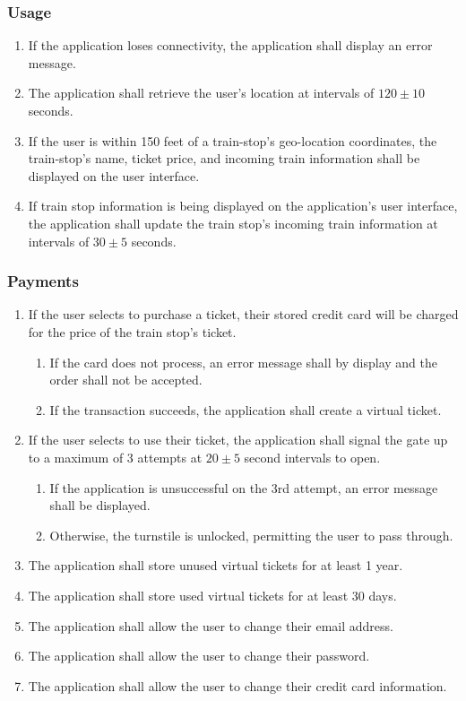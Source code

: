 	\subsubsection{Usage}\begin{enumerate}
		\item If the application loses connectivity, the application shall display an error message. 
		\item The application shall retrieve the user’s location at intervals of $120\pm10$ seconds.
		\item If the user is within 150 feet of a train-stop’s geo-location coordinates, the train-stop’s name, ticket price, and incoming train information shall be displayed on the user interface.
		\item If train stop information is being displayed on the application’s user interface, the application shall update the train stop’s incoming train information at intervals of $30\pm 5$ seconds.
	\end{enumerate}
	
	\subsubsection{Payments}\begin{enumerate}
		\item If the user selects to purchase a ticket, their stored credit card will be charged for the price of the train stop’s ticket.
		\begin{enumerate}
			\item If the card does not process, an error message shall by display and the order shall not be accepted.
			\item If the transaction succeeds, the application shall create a virtual ticket.
		\end{enumerate}
		\item If the user selects to use their ticket, the application shall signal the gate up to a maximum of 3 attempts at $20\pm 5$ second intervals to open.
			\begin{enumerate}
				\item If the application is unsuccessful on the 3rd attempt, an error message shall be displayed.
				\item Otherwise, the turnstile is unlocked, permitting the user to pass through.
			\end{enumerate}
		\item The application shall store unused virtual tickets for at least 1 year.
		\item The application shall store used virtual tickets for at least 30 days.
		\item The application shall allow the user to change their email address.
		\item The application shall allow the user to change their password.
		\item The application shall allow the user to change their credit card information.
	\end{enumerate}		
\newpage	
